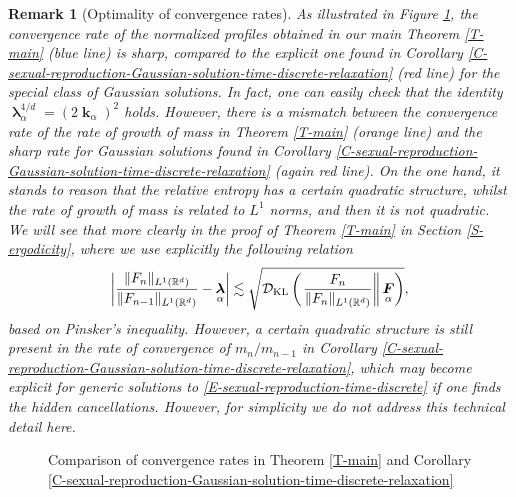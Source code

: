 \documentclass[reqno]{amsart}
\newtheorem{remark}[definition]{Remark}
\DeclareMathOperator{\blambda}{\boldsymbol{\lambda}}
\DeclareMathOperator{\bF}{\boldsymbol{F}}
\DeclareMathOperator{\bk}{\boldsymbol{k}}
\numberwithin{equation}{section}
\begin{document}
{\begin{remark}[Optimality of convergence rates]\label{R-rough-convergence-rates}
As illustrated in Figure \ref{fig:non-optimal-rates}, the convergence rate of the normalized profiles obtained in our main Theorem \ref{T-main} (blue line) is sharp, compared to the explicit one found in Corollary \ref{C-sexual-reproduction-Gaussian-solution-time-discrete-relaxation} (red line) for the special class of Gaussian solutions. In fact, one can easily check that the identity $\blambda_\alpha^{4/d}=(2\bk_\alpha)^2$ holds. However, there is a mismatch between the convergence rate of the rate of growth of mass in Theorem \ref{T-main} (orange line) and the sharp rate for Gaussian solutions found in Corollary \ref{C-sexual-reproduction-Gaussian-solution-time-discrete-relaxation} (again red line). On the one hand, it stands to reason that the relative entropy has a certain quadratic structure, whilst the rate of growth of mass is related to $L^1$ norms, and then it is not quadratic. We will see that more clearly in the proof of Theorem \ref{T-main} in Section \ref{S-ergodicity}, where we use explicitly the following relation
$$\left\vert \frac{\Vert F_n\Vert_{L^1(\mathbb{R}^d)}}{\Vert F_{n-1}\Vert_{L^1(\mathbb{R}^d)}}-\blambda_\alpha\right\vert\lesssim \sqrt{\mathcal{D}_{\rm KL}\left(\left.\frac{F_n}{\Vert F_n\Vert_{L^1(\mathbb{R}^d)}}\right\Vert \bF_\alpha\right)},$$
based on Pinsker's inequality. However, a certain quadratic structure is still present in the rate of convergence of $m_n/m_{n-1}$ in Corollary \ref{C-sexual-reproduction-Gaussian-solution-time-discrete-relaxation}, which may become explicit for generic solutions to \eqref{E-sexual-reproduction-time-discrete} if one finds the hidden cancellations. However, for simplicity we do not address this technical detail here.
\end{remark}


\begin{figure}[t]
\centering
{}
\caption{Comparison of convergence rates in Theorem \ref{T-main} and Corollary \ref{C-sexual-reproduction-Gaussian-solution-time-discrete-relaxation}}
\label{fig:non-optimal-rates}
\end{figure}

}
\end{document}
